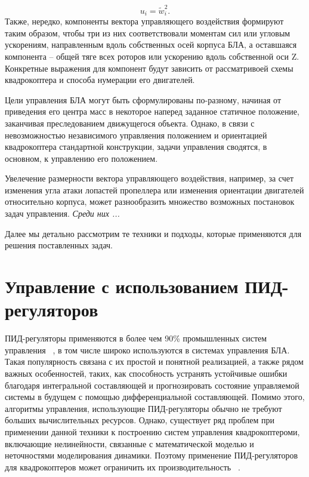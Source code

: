 \documentclass[a4paper,14pt,oneside,openany]{memoir}
\begin{document}
   	\begin{equation} \label{eq:common_control_vector}
	 u_i = \tilde{w}_i^2.
   	\end{equation}
     Также, нередко, компоненты вектора управляющего воздействия формируют таким образом, чтобы три из них соответствовали моментам сил или угловым ускорениям, направленным вдоль собственных осей корпуса БЛА, а оставшаяся компонента -- общей тяге всех роторов или ускорению вдоль собственной оси {Z}. Конкретные выражения для компонент будут зависить от рассматривоей схемы квадрокоптера и способа нумерации его двигателей.
     
     Цели управления БЛА могут быть сформулированы по-разному, начиная от приведения его центра масс в некоторое наперед заданное статичное положение, заканчивая преследованием движущегося объекта. Однако, в связи с невозможностью независимого управляения положением и ориентацией квадрокоптера стандартной конструкции, задачи управления сводятся, в основном, к управлению его положением.
     
     Увелечение размерности вектора управляющего воздействия, например, за счет изменения угла атаки лопастей пропеллера или изменения ориентации двигателей относительно корпуса, может разнообразить множество возможных постановок задач управления. \textit{Среди них ...}
     
	Далее мы детально рассмотрим те техники и подходы, которые применяются для решения поставленных задач. 
	
	\section{Управление с использованием ПИД-регуляторов}
	
	 ПИД-регуляторы применяются в более чем 90\% промышленных систем управления ~\cite{Astrom01}, в том числе широко используются в системах управления БЛА.  Такая популярность связана с их простой и понятной реализацией, а также рядом важных особенностей, таких, как способность устранять устойчивые ошибки благодаря интегральной составляющей и прогнозировать состояние управляемой системы в будущем с помощью дифференциальной составляющей. Помимо этого, алгоритмы управления, использующие ПИД-регуляторы обычно не требуют больших вычислительных ресурсов. Однако, существует ряд проблем при применении данной техники к построению систем управления квадрокоптероми, включающие нелинейности, связанные с математической моделью и неточностями моделирования динамики. Поэтому применение ПИД-регуляторов для квадрокоптеров может ограничить их производительность ~\cite{Zulu01}.
	
\end{document}
